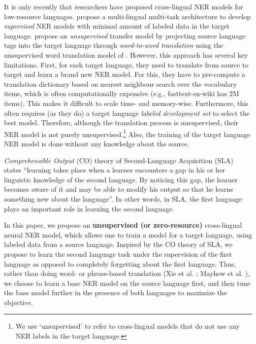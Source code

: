 \documentclass[letterpaper]{article} \usepackage{aaai20}  \usepackage{times}  \usepackage{helvet} \usepackage{courier}  \usepackage[hyphens]{url}  \usepackage{graphicx} \urlstyle{rm} \def\UrlFont{\rm}  \usepackage{graphicx}  \frenchspacing  \setlength{\pdfpagewidth}{8.5in}  \setlength{\pdfpageheight}{11in}
\newcommand{\citet}[1]{\citeauthor{#1} \shortcite{#1}}
\begin{document}
It is only recently that researchers have proposed cross-lingual NER models for low-resource languages. \citet{lin-etal-2018-multi-lingual} propose a multi-lingual multi-task architecture to develop \emph{supervised} NER models with minimal amount of labeled data in the target language. \citet{cross-ling-cmu} propose an \emph{unsupervised} transfer  model by projecting source language tags into the target language through \emph{word-to-word translation} using the unsupervised word translation model of \citet{MUSE}. However, this approach has several key limitations. First, for each target language, they need to translate from source to target and learn a brand new NER model. For this, they have to pre-compute a translation dictionary based on nearest neighbour search over the vocabulary items, which is often computationally expensive (e.g., fasttext-en-wiki has 2M items). This makes it difficult to scale time- and memory-wise. Furthermore, this often requires (as they do) a target language \emph{labeled development set} to select the best model. Therefore, although the translation process is unsupervised, their NER model is not purely unsupervised.\footnote{We use `unsupervised' to refer to cross-lingual models that do not use any NER labels in the target language.} Also, the training of the target language NER model is done without any knowledge about the source. 







\emph{Comprehensible Output} (CO) theory \cite{MERRILL95} of Second-Language Acquisition (SLA)  states ``learning takes place when a learner encounters a gap in his or her linguistic knowledge of the second language. By noticing this gap, the learner becomes aware of it and may be able to modify his output so that he learns something new about the language''. In other words, in SLA, the first language plays an important role in learning the second language. 



In this paper, we propose an \textbf{unsupervised (or zero-resource)} cross-lingual neural NER model, which allows one to train a model for a target language, using labeled data from a source language. Inspired by the CO theory of SLA, we propose to learn the second language task under the supervision of the first language as opposed to completely forgetting about the first language. Thus, rather than doing {word-} or {phrase-based} translation  (Xie et al. \citeyear{cross-ling-cmu}; Mayhew et al. \citeyear{Mayhew2017CheapTF}), we choose to learn a base NER model on the source language first, and then tune the base model further in the presence of both languages to maximize the objective. 
\end{document}
